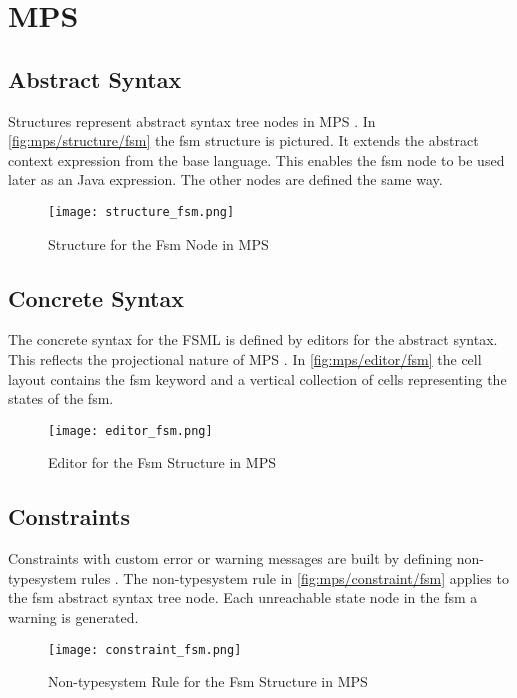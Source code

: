 \section{MPS}
\label{s:mps}

\subsection{Abstract Syntax}

Structures represent abstract syntax tree nodes in MPS \cite{pech2013jetbrains}.
In \autoref{fig:mps/structure/fsm} the fsm structure is pictured.
It extends the abstract context expression from the base language.
This enables the fsm node to be used later as an Java expression.
The other nodes are defined the same way.

\begin{figure}[H]
	\centering
	\texttt{[image: structure\_fsm.png]}
	\caption{Structure for the Fsm Node in MPS} 
	\label{fig:mps/structure/fsm}
\end{figure}

\subsection{Concrete Syntax}

The concrete syntax for the FSML is defined by editors for the abstract syntax.
This reflects the projectional nature of MPS \cite{pech2013jetbrains}.
In \autoref{fig:mps/editor/fsm} the cell layout contains the fsm keyword and a vertical collection of cells representing the states of the fsm.

\begin{figure}[H]
	\centering
	\texttt{[image: editor\_fsm.png]}
	\caption{Editor for the Fsm Structure in MPS} 
	\label{fig:mps/editor/fsm}
\end{figure}

\subsection{Constraints}

Constraints with custom error or warning messages are built by defining non-typesystem rules \cite{mpspatterns}.
The non-typesystem rule in \autoref{fig:mps/constraint/fsm} applies to the fsm abstract syntax tree node.
Each unreachable state node in the fsm a warning is generated.

\begin{figure}[H]
	\centering
	\texttt{[image: constraint\_fsm.png]}
	\caption{Non-typesystem Rule for the Fsm Structure in MPS} 
	\label{fig:mps/constraint/fsm}
\end{figure}

